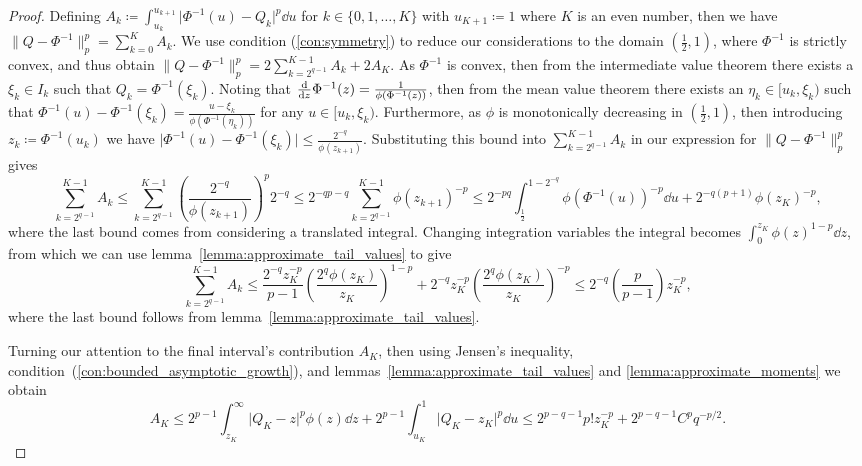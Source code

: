 \documentclass[manuscript,review]{acmart}
\begin{document}
\begin{proof} Defining $ A_k \coloneqq \int_{u_k}^{u_{k+1}} \lvert\Phi^{-1}(u) - Q_k\rvert^p \dd{u} $ for $ k \in \{0,1, \ldots, K\} $ with $ u_{K+1} \coloneqq 1 $ where $ K $ is an even number, then we have $ \lVert Q - \Phi^{-1} \rVert_p^p = \sum_{k=0}^{K} A_k $.  We use condition (\ref{con:symmetry}) to reduce our considerations to the domain $ (\tfrac{1}{2}, 1) $, where $ \Phi^{-1} $ is strictly convex, and thus obtain $ \lVert Q - \Phi^{-1} \rVert_p^p = 2 \sum_{k=2^{q-1}}^{K-1} A_k + 2 A_K $. As $ \Phi^{-1} $ is convex, then from the intermediate value theorem there exists a $ \xi_k \in I_k $ such that $ Q_k = \Phi^{-1}(\xi_k) $. Noting that $ \dv{z} \Phi^{-1}(z) = \tfrac{1}{\phi(\Phi^{-1}(z))} $, then from the mean value theorem there exists an $ \eta_k \in [u_k, \xi_k)$ such that $ \Phi^{-1}(u) - \Phi^{-1}(\xi_k) = \tfrac{u - \xi_k}{\phi(\Phi^{-1}(\eta_k))} $ for any $ u \in [u_k, \xi_k)$. Furthermore, as $ \phi $ is monotonically decreasing in $ (\tfrac{1}{2}, 1) $, then introducing $ z_k \coloneqq \Phi^{-1}(u_k) $ we have $ \lvert \Phi^{-1}(u) - \Phi^{-1}(\xi_k)\rvert \leq \tfrac{2^{-q}}{\phi(z_{k+1})}$.  Substituting this bound into $ \sum_{k=2^{q-1}}^{K-1} A_k $ in our expression for $ \lVert Q - \Phi^{-1}\rVert_p^p $ gives
\begin{equation*}
\sum_{k=2^{q-1}}^{K-1} A_k 
\leq \sum_{k=2^{q-1}}^{K - 1} \left(\frac{2^{-q}}{\phi(z_{k+1})}\right)^p 2^{-q} 
\leq 2^{-qp - q} \sum_{k=2^{q-1}}^{K - 1}  \phi(z_{k+1})^{-p} 
\leq 2^{-pq} \int_{\frac{1}{2}}^{1 - 2^{-q}} \phi(\Phi^{-1}(u))^{-p} \dd{u} + 2^{-q(p+1)}\phi(z_K)^{-p},
\end{equation*}
where the last bound comes from considering a translated integral. Changing integration variables the integral becomes $  \int_{0}^{z_K} \phi(z)^{1-p} \dd{z} $, from which we can use lemma~\ref{lemma:approximate_tail_values} to give 
\begin{equation*}
\sum_{k=2^{q-1}}^{K-1} A_k 
\leq \frac{2^{-q} z_K^{-p}}{p-1} \left(\frac{2^q\phi(z_K)}{z_K}\right)^{1-p} + 2^{-q}z_K^{-p} \left(\frac{2^q\phi(z_K)}{z_K}\right)^{-p}
\leq 2^{-q} \left(\frac{p}{p-1}\right) z_K^{-p},
\end{equation*}
where the last bound follows from lemma~\ref{lemma:approximate_tail_values}.

Turning our attention to the final interval's contribution $ A_K $, then using Jensen's inequality, condition~(\ref{con:bounded_asymptotic_growth}), and lemmas~\ref{lemma:approximate_tail_values} and \ref{lemma:approximate_moments} we obtain
\begin{equation*}
A_K 
\leq 2^{p-1} \int_{z_K}^{\infty} \lvert Q_K - z\rvert^p \phi(z) \dd{z} +  2^{p-1} \int_{u_K}^{1} \lvert Q_K - z_K \rvert^p \dd{u} 
\leq 2^{p-q-1} p! z_K^{-p} + 2^{p-q-1} C^p q^{-p/2}.
\end{equation*}


\end{proof}
\end{document}
